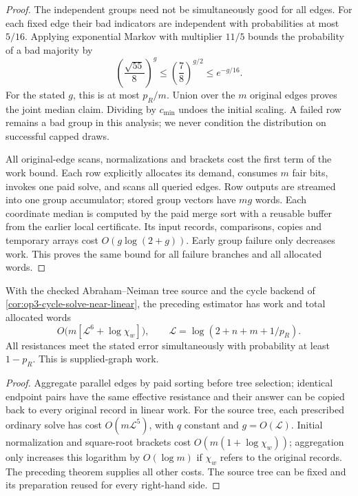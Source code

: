 \begin{proof}
The independent groups need not be simultaneously good for all edges.
For each fixed edge their bad indicators are independent with probabilities
at most $5/16$. Applying exponential Markov with multiplier $11/5$
bounds the probability of a bad majority by
\[
 \left(\frac{\sqrt{55}}8\right)^g
 \leq\left(\frac78\right)^{g/2}\leq e^{-g/16}.
\]
For the stated $g$, this is at most $p_R/m$. Union over the $m$
original edges proves the joint median claim. Dividing by $c_{\min}$
undoes the initial scaling. A failed row remains a bad group in this
analysis; we never condition the distribution on successful capped draws.

All original-edge scans, normalizations and brackets cost the first
term of the work bound. Each row explicitly allocates its demand,
consumes $m$ fair bits, invokes one paid solve, and scans all queried
edges. Row outputs are streamed into one group accumulator; stored group
vectors have $mg$ words. Each coordinate median is computed by the paid
merge sort with a reusable buffer from the earlier local certificate.
Its input records, comparisons, copies and temporary arrays cost
$O(g\log(2+g))$. Early group failure only decreases work. This proves
the same bound for all failure branches and all allocated words.
\end{proof}

\begin{corollary}
\label{cor:op3-resistance-near-linear}
With the checked Abraham--Neiman tree source and the cycle backend of
\cref{cor:op3-cycle-solve-near-linear}, the preceding estimator has
work and total allocated words
\[
 O\bigl(m[\mathcal L^6+\log\chi_w]\bigr),
 \qquad \mathcal L=\log(2+n+m+1/p_R).
\]
All resistances meet the stated error simultaneously with probability
at least $1-p_R$. This is supplied-graph work.
\end{corollary}
\begin{proof}
Aggregate parallel edges by paid sorting before tree selection; identical
endpoint pairs have the same effective resistance and their answer can
be copied back to every original record in linear work. For the source
tree, each prescribed ordinary solve has cost $O(m\mathcal L^5)$,
with $q$ constant and $g=O(\mathcal L)$. Initial normalization and
square-root brackets cost $O(m(1+\log\chi_w))$; aggregation only
increases this logarithm by $O(\log m)$ if $\chi_w$ refers to the original
records. The preceding theorem supplies all other costs. The source tree
can be fixed and its preparation reused for every right-hand side.
\end{proof}

